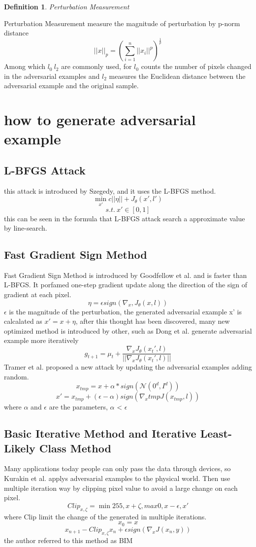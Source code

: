 \documentclass[twoside,twocolumn]{article}
\newtheorem{definition}{Definition}
\begin{document}
\begin{definition}
	Perturbation Measurement
\end{definition}
Perturbation Measurement measure the magnitude of perturbation by p-norm distance$$||x||_p = (\sum_{i = 1}^{n}||x_i||^p)^\frac{1}{p}$$
Among which $l_0 \ l_2$ are commonly used, for $l_0$ counts the number of pixels changed in the adversarial examples and $l_2$ measures the Euclidean distance between the adversarial example and the original sample.
\section{how to generate adversarial example}
\subsection{L-BFGS Attack}
this attack is introduced by Szegedy, and it uses the L-BFGS method. 
$$\min_{x'} c||\eta||+J_\theta(x', l')$$
$$s.t. \ x' \in  [0,1]$$
this can be seen in the formula that L-BFGS attack search a approximate value by line-search.

\subsection{Fast Gradient Sign Method}
Fast Gradient Sign Method is introduced by Goodfellow et al. and is faster than L-BFGS. It porfamed one-step gradient update along the direction of the sign of gradient at each pixel.
$$\eta = \epsilon sign(\nabla_x, J_\theta(x, l))$$ 
$\epsilon$ is the magnitude of the perturbation, the generated adversarial example x' is calcalated as $x' = x + \eta$, after this thought has been discovered, many new optimized method is introduced by other, such as Dong et al. generate adversarial example more iteratively
$$g_{t+1} = \mu_t + \frac{\nabla_xJ_\theta(x_t', l)}{||\nabla_xJ_\theta(x_t', l)||}$$
Tramer et al. proposed a new attack by updating the adversarial examples adding random.
$$x_{tmp} = x + \alpha*sign(\mathcal{N}(0^d, I^d))$$
$$x' = x_{tmp} + (\epsilon -\alpha) sign(\nabla_x{tmp} J (x_{tmp}, l))$$
where $\alpha$ and $\epsilon$ are the parameters, $\alpha$ < $\epsilon$

\subsection{Basic Iterative Method and Iterative Least-Likely Class Method}
Many applications today people can only pass the data through devices, so Kurakin et al. applys adversarial examples to the physical world. Then use multiple iteration way by clipping pixel value to avoid a large change on each pixel.
$$Clip_{x, \zeta} = \min{255, x+\zeta, max{0, x-\epsilon, x'}}$$where Clip limit the change of the generated in multiple iterations.
$$x_0 = x$$
$$x_{n+1} - Clip_{x, \zeta} {x_n + \epsilon sign(\nabla_xJ(x_n, y))}$$
the author referred to this method as BIM
\end{document}
